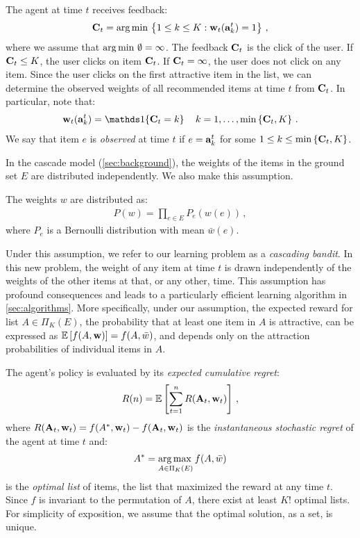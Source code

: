 The agent at time $t$ receives feedback:
\begin{align*}
  \mathbf{C}_t = \operatorname*{arg\,min\,} \left\{1 \leq k \leq K: \mathbf{w}_t(\mathbf{a}^t_k) = 1\right\}\,,
\end{align*}
where we assume that $\operatorname*{arg\,min\,} \emptyset = \infty$. The feedback $\mathbf{C}_t$ is the click of the user. If $\mathbf{C}_t \leq K$, the user clicks on item $\mathbf{C}_t$. If $\mathbf{C}_t = \infty$, the user does not click on any item. Since the user clicks on the first attractive item in the list, we can determine the observed weights of all recommended items at time $t$ from $\mathbf{C}_t$. In particular, note that:
\begin{align}
  \rnd{w}_t(\rnd{a}^t_k) = \I{\rnd{C}_t = k} \quad k = 1, \dots, \min \set{\rnd{C}_t, K}\,.
  \label{eq:click}
\end{align}
We say that item $e$ is \emph{observed} at time $t$ if $e = \mathbf{a}^t_k$ for some $1 \leq k \leq \min \left\{\mathbf{C}_t, K\right\}$.

In the cascade model (\cref{sec:background}), the weights of the items in the ground set $E$ are distributed independently. We also make this assumption.

\begin{assumption}
\label{ass:independence} The weights $w$ are distributed as:
\begin{align*}
  P(w) = \prod_{e \in E} P_e(w(e))\,,
\end{align*}
where $P_e$ is a Bernoulli distribution with mean $\bar{w}(e)$.
\end{assumption}

Under this assumption, we refer to our learning problem as a \emph{cascading bandit}. In this new problem, the weight of any item at time $t$ is drawn independently of the weights of the other items at that, or any other, time. This assumption has profound consequences and leads to a particularly efficient learning algorithm in \cref{sec:algorithms}. More specifically, under our assumption, the expected reward for list $A \in \Pi_K(E)$, the probability that at least one item in $A$ is attractive, can be expressed as $\mathbb{E} \left[f(A, \mathbf{w})\right] = f(A, \bar{w})$, and depends only on the attraction probabilities of individual items in $A$.

The agent's policy is evaluated by its \emph{expected cumulative regret}:
\begin{align*}
  R(n) = \mathbb{E} \left[\sum_{t = 1}^n R(\mathbf{A}_t, \mathbf{w}_t)\right]\,,
\end{align*}
where $R(\mathbf{A}_t, \mathbf{w}_t) = f(A^\ast, \mathbf{w}_t) - f(\mathbf{A}_t, \mathbf{w}_t)$ is the \emph{instantaneous stochastic regret} of the agent at time $t$ and:
\begin{align*}
  A^\ast = \operatorname*{arg\,max\,}_{A \in \Pi_K(E)} f(A, \bar{w})
\end{align*}
is the \emph{optimal list} of items, the list that maximized the reward at any time $t$. Since $f$ is invariant to the permutation of $A$, there exist at least $K!$ optimal lists. For simplicity of exposition, we assume that the optimal solution, as a set, is unique.


